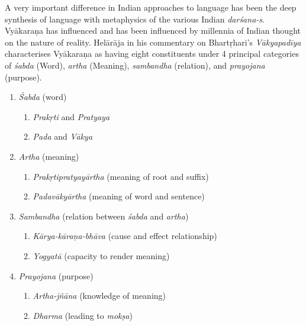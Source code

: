A very important difference in Indian approaches to language has been the deep synthesis of language with metaphysics of the various Indian \textit{darśana-s}. Vyākaraṇa has influenced and has been influenced by millennia of Indian thought on the nature of reality. Helārāja in his commentary on Bhartṛhari’s \textit{Vākyapadīya} characterises Vyākaraṇa as having eight constituents under 4 principal categories of \textit{śabda} (Word), \textit{artha} (Meaning), \textit{sambandha}  (relation), and \textit{prayojana} (purpose).
\begin{enumerate}[topsep=0pt]
\itemsep=0pt
\item \textit{Śabda} (word)
\begin{enumerate}[topsep=-2pt]
\itemsep=0pt
\item \textit{Prakṛti} and \textit{Pratyaya}
 \item \textit{Pada} and \textit{Vākya}
\end{enumerate}
 \item \textit{Artha} (meaning)
\begin{enumerate}[topsep=-2pt]
\itemsep=0pt
\item \textit{Prakṛtipratyayārtha} (meaning of root and suffix)
 \item \textit{Padavākyārtha} (meaning of word and sentence) 
\end{enumerate}
 \item \textit{Sambandha} (relation between \textit{śabda} and \textit{artha})
\begin{enumerate}[topsep=-2pt]
\itemsep=0pt
\item \textit{Kārya-kāraṇa-bhāva} (cause and effect relationship)
 \item \textit{Yogyatā} (capacity to render meaning)
\end{enumerate}
 \item \textit{Prayojana} (purpose)
\begin{enumerate}[topsep=-2pt]
\itemsep=0pt
\item \textit{Artha-jñāna} (knowledge of meaning)
 \item \textit{Dharma} (leading to \textit{mokṣa})
\end{enumerate}
\end{enumerate}

